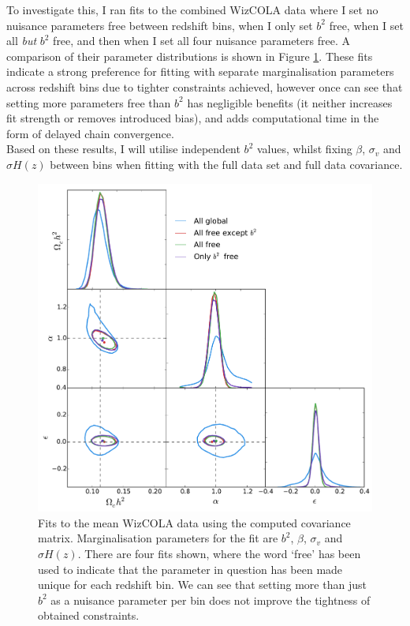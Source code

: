 \documentclass[titlesmallcaps, examinerscopy, copyrightpage]{uqthesis}
\begin{document}
To investigate this, I ran fits to the combined WizCOLA data where I set no nuisance parameters free between redshift bins, when I only set $b^2$ free, when I set all \textit{but} $b^2$ free, and then when I set all four nuisance parameters free. A comparison of their parameter distributions is shown in Figure \ref{fig:wizcolaAllNormalCovCombined}. These fits indicate a strong preference for fitting with separate marginalisation parameters across redshift bins due to tighter constraints achieved, however once can see that setting more parameters free than $b^2$ has negligible benefits (it neither increases fit strength or removes introduced bias), and adds computational time in the form of delayed chain convergence.\\

Based on these results, I will utilise independent $b^2$ values, whilst fixing $\beta$, $\sigma_v$ and $\sigma H(z)$ between bins when fitting with the full data set and full data covariance.\\


\begin{figure}[h!]
  \begin{center}
    \includegraphics[width=\textwidth]{images/wizcolaAllNormalCovCombined.pdf}
  \end{center}
  \caption{Fits to the mean WizCOLA data using the computed covariance matrix. Marginalisation parameters for the fit are $b^2$, $\beta$, $\sigma_v$ and $\sigma H(z)$. There are four fits shown, where the word `free' has been used to indicate that the parameter in question has been made unique for each redshift bin. We can see that setting more than just $b^2$ as a nuisance parameter per bin does not improve the tightness of obtained constraints.}
  \label{fig:wizcolaAllNormalCovCombined}
\end{figure}
\end{document}
